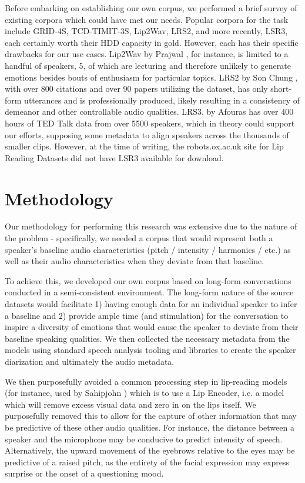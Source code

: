 \documentclass[10pt,twocolumn,letterpaper]{article}
\begin{document}
Before embarking on establishing our own corpus, we performed a brief survey of existing corpora which could have met our needs. Popular corpora for the task include GRID-4S, TCD-TIMIT-3S, Lip2Wav, LRS2, and more recently, LSR3, each certainly worth their HDD capacity in gold. However, each has their specific drawbacks for our use cases. Lip2Wav by Prajwal \cite{LipWavCorpus2020}, for instance, is limited to a handful of speakers, 5, of which are lecturing and therefore unlikely to generate emotions besides bouts of enthusiasm for particular topics.  LRS2 by Son Chung \cite{LipCorpus2017}, with over 800 citations and over 90 papers utilizing the dataset, has only short-form utterances and is professionally produced, likely resulting in a consistency of demeanor and other controllable audio qualities. LRS3, by Afouras \cite{LSR3} has over 400 hours of TED Talk data from over 5500 speakers, which in theory could support our efforts, supposing some metadata to align speakers across the thousands of smaller clips. However, at the time of writing, the robots.ox.ac.uk site for Lip Reading Datasets did not have LSR3 available for download. 

\section{Methodology}
\label{sec:methodology}

Our methodology for performing this research was extensive due to the nature of the problem - specifically, we needed a corpus that would represent both a speaker's baseline audio characteristics (pitch / intensity / harmonics / etc.) as well as their audio characteristics when they deviate from that baseline. 

To achieve this, we developed our own corpus based on long-form conversations conducted in a semi-consistent environment. The long-form nature of the source datasets would facilitate 1) having enough data for an individual speaker to infer a baseline and 2) provide ample time (and stimulation) for the conversation to inspire a diversity of emotions that would cause the speaker to deviate from their baseline speaking qualities. We then collected the necessary metadata from the models using standard speech analysis tooling and libraries to create the speaker diarization and ultimately the audio metadata. 

We then purposefully avoided a common processing step in lip-reading models (for instance, used by Sahipjohn \etal \cite{RobustL2S} )  which is to use a Lip Encoder, i.e. a model which will remove excess visual data and zero in on the lips itself. We purposefully removed this to allow for the capture of other information that may be predictive of these other audio qualities. For instance, the distance between a speaker and the microphone may be conducive to predict intensity of speech. Alternatively, the upward movement of the eyebrows relative to the eyes may be predictive of a raised pitch, as the entirety of the facial expression may express surprise or the onset of a questioning mood.   
\end{document}

